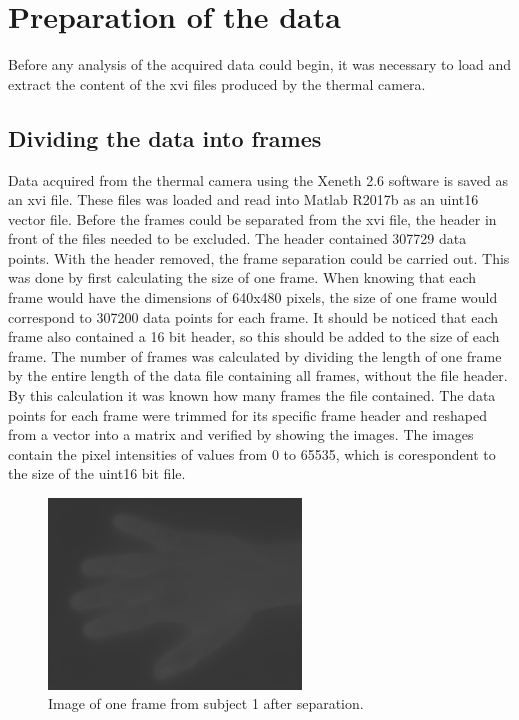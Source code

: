 \chapter{Preparation of the data}

Before any analysis of the acquired data could begin, it was necessary to load and extract the content of the xvi files produced by the thermal camera.  

\section{Dividing the data into frames}

Data acquired from the thermal camera using the Xeneth 2.6 software is saved as an xvi file. These files was loaded and read into Matlab R2017b as an uint16 vector file. Before the frames could be separated from the xvi file, the header in front of the files needed to be excluded. The header contained 307729 data points. With the header removed, the frame separation could be carried out. This was done by first calculating the size of one frame. When knowing that each frame would have the dimensions of 640x480 pixels, the size of one frame would correspond to 307200 data points for each frame. It should be noticed that each frame also contained a 16 bit header, so this should be added to the size of each frame. The number of frames was calculated by dividing the length of one frame by the entire length of the data file containing all frames, without the file header. By this calculation it was known how many frames the file contained. The data points for each frame were trimmed for its specific frame header and reshaped from a vector into a matrix and verified by showing the images. 
The images contain the pixel intensities of values from 0 to 65535, which is corespondent to the size of the uint16 bit file. 


\begin{figure}[H]
	\includegraphics[width=0.6\textwidth]{figures/uint16Hand}  %
	\caption{Image of one frame from subject 1 after separation.}
	\label{fig:hand}  %
\end{figure}